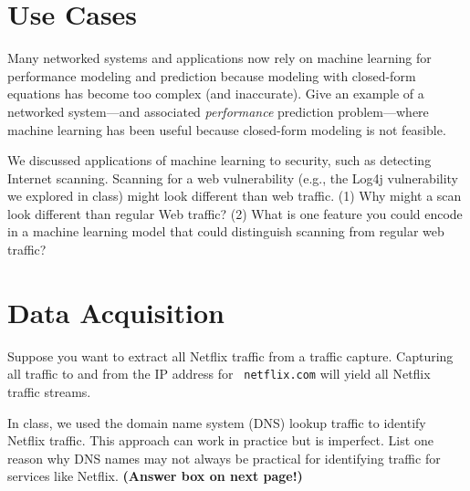\section*{Use Cases}

 Many networked systems and applications now rely on machine learning
for performance modeling and prediction because modeling with closed-form
equations has become too complex (and inaccurate). Give an example of a
networked system---and associated {\em performance} prediction problem---where
machine learning has been useful because closed-form modeling is not feasible.

\eprob

 We discussed applications of machine learning to security, such as
detecting Internet scanning. Scanning for a web vulnerability
(e.g., the Log4j vulnerability we explored in class) might look different than
web traffic. (1) Why might a scan look different than regular Web traffic?
(2) What is one feature you could encode in a machine learning model that
could distinguish scanning from regular web traffic?

\eprob

\section*{Data Acquisition}

 Suppose you want to extract all Netflix traffic from a traffic
capture.  Capturing all traffic to and from the IP address for {\tt
netflix.com}  will yield all Netflix traffic streams.
\framebox{
\yesnono
}
\eprob

In class, we used the domain name system (DNS) lookup traffic to identify Netflix
traffic. This approach can work in practice but is imperfect. List one reason
why DNS names may not always be practical for identifying traffic for services
like Netflix. {\bf (Answer box on next page!)}

\eprob

